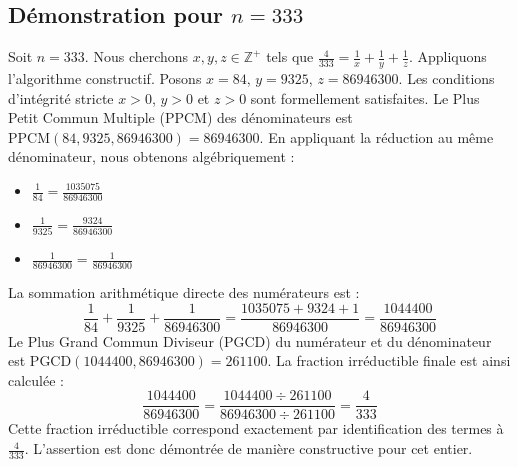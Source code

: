 \documentclass[11pt,a4paper]{article}
\begin{document}
\subsection{Démonstration pour $n = 333$}
Soit $n = 333$. Nous cherchons $x, y, z \in \mathbb{Z}^{+}$ tels que $\frac{4}{333} = \frac{1}{x} + \frac{1}{y} + \frac{1}{z}$.
Appliquons l'algorithme constructif. Posons $x = 84$, $y = 9325$, $z = 86946300$.
Les conditions d'intégrité stricte $x > 0$, $y > 0$ et $z > 0$ sont formellement satisfaites.
Le Plus Petit Commun Multiple (PPCM) des dénominateurs est $\text{PPCM}(84, 9325, 86946300) = 86946300$.
En appliquant la réduction au même dénominateur, nous obtenons algébriquement :
\begin{itemize}
    \item $\frac{1}{84} = \frac{1035075}{86946300}$
    \item $\frac{1}{9325} = \frac{9324}{86946300}$
    \item $\frac{1}{86946300} = \frac{1}{86946300}$
\end{itemize}
La sommation arithmétique directe des numérateurs est :
$$ \frac{1}{84} + \frac{1}{9325} + \frac{1}{86946300} = \frac{1035075 + 9324 + 1}{86946300} = \frac{1044400}{86946300} $$
Le Plus Grand Commun Diviseur (PGCD) du numérateur et du dénominateur est $\text{PGCD}(1044400, 86946300) = 261100$.
La fraction irréductible finale est ainsi calculée :
$$ \frac{1044400}{86946300} = \frac{1044400 \div 261100}{86946300 \div 261100} = \frac{4}{333} $$
Cette fraction irréductible correspond exactement par identification des termes à $\frac{4}{333}$. L'assertion est donc démontrée de manière constructive pour cet entier.
\end{document}
